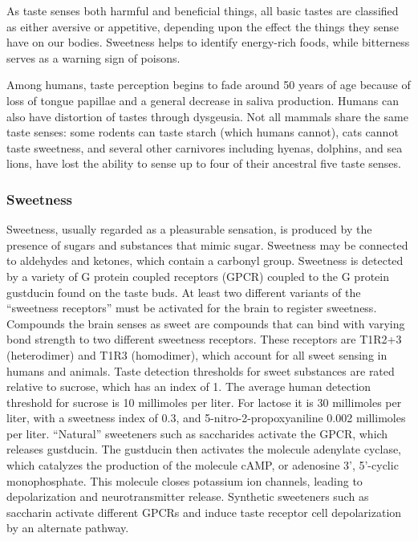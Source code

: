 As taste senses both harmful and beneficial things, all basic tastes are
classified as either aversive or appetitive, depending upon the effect
the things they sense have on our bodies. Sweetness helps to identify
energy-rich foods, while bitterness serves as a warning sign of poisons.

Among humans, taste perception begins to fade around 50 years of age
because of loss of tongue papillae and a general decrease in saliva
production. Humans can also have distortion of tastes through dysgeusia.
Not all mammals share the same taste senses: some rodents can taste
starch (which humans cannot), cats cannot taste sweetness, and several
other carnivores including hyenas, dolphins, and sea lions, have lost
the ability to sense up to four of their ancestral five taste senses.

\hypertarget{sweetness}{%
\subsubsection{Sweetness}\label{sweetness}}

Sweetness, usually regarded as a pleasurable sensation, is produced by
the presence of sugars and substances that mimic sugar. Sweetness may be
connected to aldehydes and ketones, which contain a carbonyl group.
Sweetness is detected by a variety of G protein coupled receptors (GPCR)
coupled to the G protein gustducin found on the taste buds. At least two
different variants of the ``sweetness receptors'' must be activated for
the brain to register sweetness. Compounds the brain senses as sweet are
compounds that can bind with varying bond strength to two different
sweetness receptors. These receptors are T1R2+3 (heterodimer) and T1R3
(homodimer), which account for all sweet sensing in humans and animals.
Taste detection thresholds for sweet substances are rated relative to
sucrose, which has an index of 1. The average human detection threshold
for sucrose is 10 millimoles per liter. For lactose it is 30 millimoles
per liter, with a sweetness index of 0.3, and 5-nitro-2-propoxyaniline
0.002 millimoles per liter. ``Natural'' sweeteners such as saccharides
activate the GPCR, which releases gustducin. The gustducin then
activates the molecule adenylate cyclase, which catalyzes the production
of the molecule cAMP, or adenosine 3', 5'-cyclic monophosphate. This
molecule closes potassium ion channels, leading to depolarization and
neurotransmitter release. Synthetic sweeteners such as saccharin
activate different GPCRs and induce taste receptor cell depolarization
by an alternate pathway.

